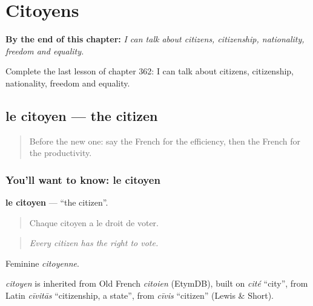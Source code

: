 
\chapter{Citoyens}
\label{ch:fr-citoyens}

\begin{chapteropening}
\textbf{By the end of this chapter:} \emph{I can talk about citizens, citizenship, nationality, freedom and equality.}

Complete the last lesson of chapter 362: I can talk about citizens, citizenship, nationality, freedom and equality.
\end{chapteropening}

\section[le citoyen]{le citoyen — the citizen}

\label{lesson:FR-C362-citoyen}



\begin{quote}
Before the new one: say the French for the efficiency, then the French for the productivity.
\end{quote}

\subsection*{You'll want to know: le citoyen}
\textbf{le citoyen} — \textquotedblleft{}the citizen\textquotedblright{}.

\begin{quote}
Chaque citoyen a le droit de voter.
\end{quote}

\begin{quote}
\emph{Every citizen has the right to vote.}
\end{quote}

Feminine \emph{citoyenne}.

\begin{cousinweb}
\emph{citoyen} is inherited from Old French \emph{citoien} (EtymDB), built on \emph{cité} \textquotedblleft{}city\textquotedblright{}, from Latin \emph{cīvitās} \textquotedblleft{}citizenship, a state\textquotedblright{}, from \emph{cīvis} \textquotedblleft{}citizen\textquotedblright{} (Lewis \& Short).
\end{cousinweb}

